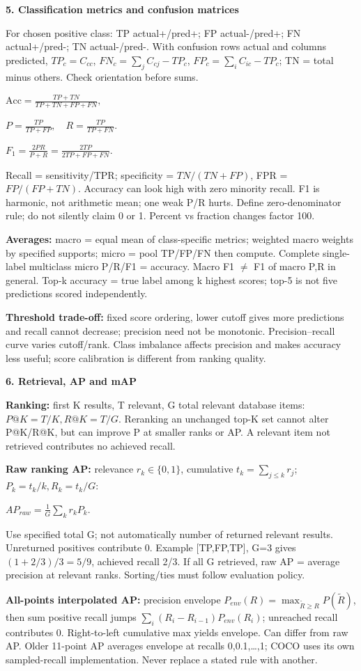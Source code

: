 \documentclass[a4paper]{article}
\newcommand{\key}[1]{\textbf{#1}}
\newcommand{\Topic}[1]{\par\vspace{1.7pt}\noindent
  {\fontsize{7.7}{8.0}\selectfont\bfseries #1}\par\vspace{0.3pt}}
\newcommand{\eq}[1]{\par\noindent\mbox{\(\displaystyle #1\)}\par}
\newcounter{sheet}
\newcounter{sheetcolumn}
\newlength{\colwidth}
\newenvironment{sheetcol}[1][7.0]{\stepcounter{sheetcolumn}
  \begin{lrbox}{\columnbox}\begin{minipage}[t]{\colwidth}\vspace{0pt}
  \fontsize{#1}{\dimexpr#1pt+0.6pt\relax}\selectfont}
  {\end{minipage}\end{lrbox}
  \typeout{CV1COL|\thesheet|\thesheetcolumn|\the\dimexpr\ht\columnbox+\dp\columnbox\relax}
  \usebox{\columnbox}\ignorespacesafterend}
\begin{document}
\begin{sheetcol}
\Topic{5. Classification metrics and confusion matrices}
For chosen positive class: TP actual+/pred+; FP actual-/pred+; FN actual+/pred-; TN actual-/pred-. With confusion rows actual and columns predicted, \(TP_c=C_{cc}\), \(FN_c=\sum_jC_{cj}-TP_c\), \(FP_c=\sum_iC_{ic}-TP_c\); TN = total minus others. Check orientation before sums.
\eq{\mathrm{Acc}=\frac{TP+TN}{TP+TN+FP+FN},}
\eq{P=\frac{TP}{TP+FP},\quad R=\frac{TP}{TP+FN}.}
\eq{F_1=\frac{2PR}{P+R}=\frac{2TP}{2TP+FP+FN}.}
Recall = sensitivity/TPR; specificity = \(TN/(TN+FP)\), FPR = \(FP/(FP+TN)\). Accuracy can look high with zero minority recall. F1 is harmonic, not arithmetic mean; one weak P/R hurts. Define zero-denominator rule; do not silently claim 0 or 1. Percent vs fraction changes factor 100.

\key{Averages:} macro = equal mean of class-specific metrics; weighted macro weights by specified supports; micro = pool TP/FP/FN then compute. Complete single-label multiclass micro P/R/F1 = accuracy. Macro F1 \(\ne\) F1 of macro P,R in general. Top-k accuracy = true label among k highest scores; top-5 is not five predictions scored independently.

\key{Threshold trade-off:} fixed score ordering, lower cutoff gives more predictions and recall cannot decrease; precision need not be monotonic. Precision--recall curve varies cutoff/rank. Class imbalance affects precision and makes accuracy less useful; score calibration is different from ranking quality.

\Topic{6. Retrieval, AP and mAP}
\key{Ranking:} first K results, T relevant, G total relevant database items: \(P@K=T/K, R@K=T/G\). Reranking an unchanged top-K set cannot alter P@K/R@K, but can improve P at smaller ranks or AP. A relevant item not retrieved contributes no achieved recall.

\key{Raw ranking AP:} relevance \(r_k\in\{0,1\}\), cumulative \(t_k=\sum_{j\le k}r_j\); \(P_k=t_k/k, R_k=t_k/G\):
\eq{AP_{raw}=\frac1G\sum_k r_k P_k.}
Use specified total G; not automatically number of returned relevant results. Unreturned positives contribute 0. Example [TP,FP,TP], G=3 gives \((1+2/3)/3=5/9\), achieved recall 2/3. If all G retrieved, raw AP = average precision at relevant ranks. Sorting/ties must follow evaluation policy.

\key{All-points interpolated AP:} precision envelope \(P_{env}(R)=\max_{\tilde R\ge R}P(\tilde R)\), then sum positive recall jumps \(\sum_i(R_i-R_{i-1})P_{env}(R_i)\); unreached recall contributes 0. Right-to-left cumulative max yields envelope. Can differ from raw AP. Older 11-point AP averages envelope at recalls 0,0.1,\ldots,1; COCO uses its own sampled-recall implementation. Never replace a stated rule with another.


\end{sheetcol}
\end{document}
